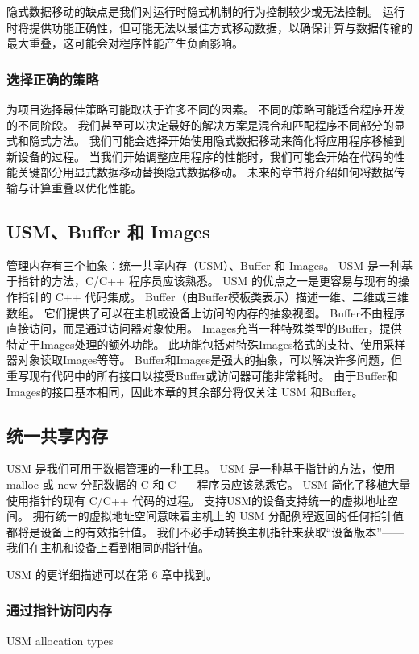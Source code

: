 隐式数据移动的缺点是我们对运行时隐式机制的行为控制较少或无法控制。 
运行时将提供功能正确性，但可能无法以最佳方式移动数据，以确保计算与数据传输的最大重叠，这可能会对程序性能产生负面影响。

\subsubsection{选择正确的策略}
为项目选择最佳策略可能取决于许多不同的因素。 不同的策略可能适合程序开发的不同阶段。 
我们甚至可以决定最好的解决方案是混合和匹配程序不同部分的显式和隐式方法。 
我们可能会选择开始使用隐式数据移动来简化将应用程序移植到新设备的过程。 
当我们开始调整应用程序的性能时，我们可能会开始在代码的性能关键部分用显式数据移动替换隐式数据移动。 
未来的章节将介绍如何将数据传输与计算重叠以优化性能。

\subsection{USM、Buffer 和 Images}
管理内存有三个抽象：统一共享内存（USM）、Buffer 和 Images。 USM 是一种基于指针的方法，C/C++ 程序员应该熟悉。 
USM 的优点之一是更容易与现有的操作指针的 C++ 代码集成。 Buffer（由Buffer模板类表示）描述一维、二维或三维数组。 
它们提供了可以在主机或设备上访问的内存的抽象视图。 Buffer不由程序直接访问，而是通过访问器对象使用。 
Images充当一种特殊类型的Buffer，提供特定于Images处理的额外功能。 
此功能包括对特殊Images格式的支持、使用采样器对象读取Images等等。 
Buffer和Images是强大的抽象，可以解决许多问题，但重写现有代码中的所有接口以接受Buffer或访问器可能非常耗时。 
由于Buffer和Images的接口基本相同，因此本章的其余部分将仅关注 USM 和Buffer。

\subsection{统一共享内存}
USM 是我们可用于数据管理的一种工具。 
USM 是一种基于指针的方法，使用 malloc 或 new 分配数据的 C 和 C++ 程序员应该熟悉它。 
USM 简化了移植大量使用指针的现有 C/C++ 代码的过程。 支持USM的设备支持统一的虚拟地址空间。 
拥有统一的虚拟地址空间意味着主机上的 USM 分配例程返回的任何指针值都将是设备上的有效指针值。 
我们不必手动转换主机指针来获取“设备版本”——我们在主机和设备上看到相同的指针值。

USM 的更详细描述可以在第 6 章中找到。

\subsubsection{通过指针访问内存}
{\color{red} USM allocation types}


